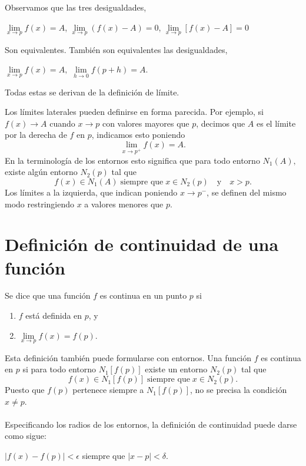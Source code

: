 Observamos que las tres desigualdades,

\begin{center}
    $\lim\limits_{x\to p}f(x)=A$, $\lim\limits_{x\to p}(f(x)-A)=0$, $\lim\limits_{x\to p}[f(x)-A]=0$
\end{center}

Son equivalentes. También son equivalentes las desigualdades,
    
\begin{center}
    $\lim\limits_{x\to p} f(x)=A,$ $\lim\limits_{h\to 0}f(p+h)=A.$
\end{center}

Todas estas se derivan de la definición de límite.\\
    \begin{def.}
	Los límites laterales pueden definirse en forma parecida. Por ejemplo, si ${f(x)\to A}$ cuando ${x\to p}$ con valores mayores que $p$, decimos que $A$ es el límite por la derecha de $f$ en $p$, indicamos esto poniendo
	$$\lim_{x\to p^+}f(x)=A.$$
	En la terminología de los entornos esto significa que para todo entorno $N_1(A),$ existe algún entorno $N_2(p)$ tal que 
	$$f(x)\in N_1(A)\; \mbox{siempre que}\; x \in N_2(p)\quad \mbox{y}\quad x>p.$$
	Los límites a la izquierda, que indican poniendo ${x\to p^-}$, se definen del mismo modo restringiendo $x$ a valores menores que $p$.
    \end{def.}

\section{Definición de continuidad de una función}

    \begin{def.}
	Se dice que una función $f$ es continua en un punto $p$ si 
	\begin{enumerate}[\bfseries a)]
	    \item $f$ está definida en $p$, y
	    \item $\lim\limits_{x\to p}f(x)=f(p)$.
	\end{enumerate}
	Esta definición también puede formularse con entornos. Una función $f$ es continua en $p$ si para todo entorno $N_1[f(p)]$ existe un entorno $N_2(p)$ tal que 
	$$f(x)\in N_1[f(p)]\; \mbox{siempre que}\; x \in N_2(p).$$
	Puesto que $f(p)$ pertenece siempre a $N_1[f(p)]$, no se precisa la condición $x\neq p$.\\\\
	Especificando los radios de los entornos, la definición de continuidad puede darse como sigue:
	\begin{center}
	    $|f(x)-f(p)|<\epsilon$ siempre que $|x-p|<\delta$.
	\end{center}
    \end{def.}

